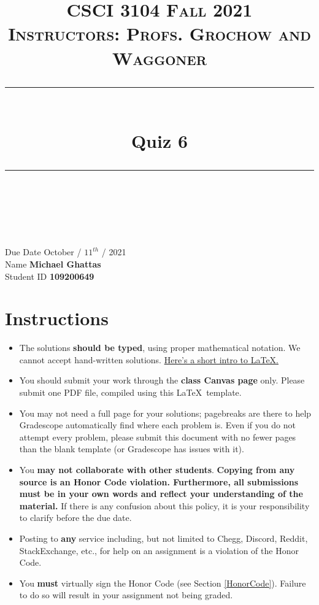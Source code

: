 \documentclass[11pt]{article}
\title{
\normalfont \normalsize 
\textsc{CSCI 3104 Fall 2021 \\ 
Instructors: Profs. Grochow and Waggoner} \\
[10pt] 
\rule{\linewidth}{0.5pt} \\[6pt] 
\huge Quiz 6 \\
\rule{\linewidth}{2pt}  \\[10pt]
}
\date{}
\theoremstyle{definition}
\theoremstyle{definition}
\theoremstyle{definition}
\begin{document}

\maketitle


\noindent
Due Date \dotfill October / $11^{th}$ / 2021 \\
Name \dotfill \textbf{Michael Ghattas} \\
Student ID \dotfill \textbf{109200649} \\


\tableofcontents

\section{Instructions}
 \begin{itemize}
	\item The solutions \textbf{should be typed}, using proper mathematical notation. We cannot accept hand-written solutions. \href{http://ece.uprm.edu/~caceros/latex/introduction.pdf}{Here's a short intro to \LaTeX.}
	\item You should submit your work through the \textbf{class Canvas page} only. Please submit one PDF file, compiled using this \LaTeX \ template.
	\item You may not need a full page for your solutions; pagebreaks are there to help Gradescope automatically find where each problem is. Even if you do not attempt every problem, please submit this document with no fewer pages than the blank template (or Gradescope has issues with it).

	\item You \textbf{may not collaborate with other students}. \textbf{Copying from any source is an Honor Code violation. Furthermore, all submissions must be in your own words and reflect your understanding of the material.} If there is any confusion about this policy, it is your responsibility to clarify before the due date. 

	\item Posting to \textbf{any} service including, but not limited to Chegg, Discord, Reddit, StackExchange, etc., for help on an assignment is a violation of the Honor Code.

	\item You \textbf{must} virtually sign the Honor Code (see Section \ref{HonorCode}). Failure to do so will result in your assignment not being graded.
\end{itemize}
\end{document}
